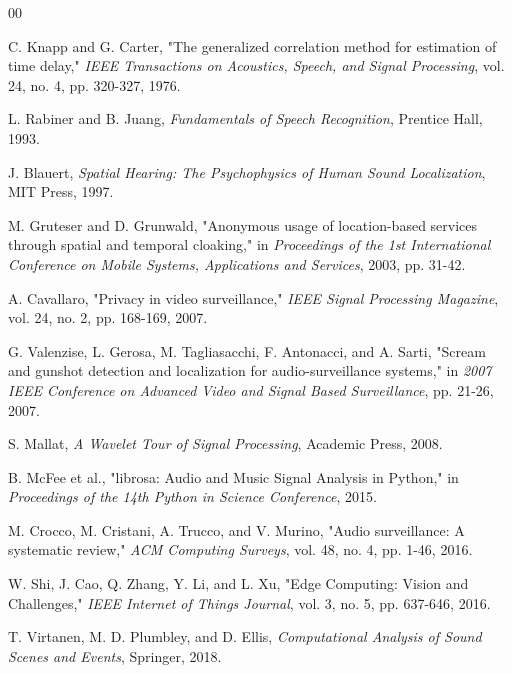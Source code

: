 \documentclass[conference]{IEEEtran}
\begin{document}
\begin{thebibliography}{00}

 C. Knapp and G. Carter, "The generalized correlation method for estimation of time delay," \textit{IEEE Transactions on Acoustics, Speech, and Signal Processing}, vol. 24, no. 4, pp. 320-327, 1976.


 L. Rabiner and B. Juang, \textit{Fundamentals of Speech Recognition}, Prentice Hall, 1993.

 J. Blauert, \textit{Spatial Hearing: The Psychophysics of Human Sound Localization}, MIT Press, 1997.

 M. Gruteser and D. Grunwald, "Anonymous usage of location-based services through spatial and temporal cloaking," in \textit{Proceedings of the 1st International Conference on Mobile Systems, Applications and Services}, 2003, pp. 31-42.

 A. Cavallaro, "Privacy in video surveillance," \textit{IEEE Signal Processing Magazine}, vol. 24, no. 2, pp. 168-169, 2007.

 G. Valenzise, L. Gerosa, M. Tagliasacchi, F. Antonacci, and A. Sarti, "Scream and gunshot detection and localization for audio-surveillance systems," in \textit{2007 IEEE Conference on Advanced Video and Signal Based Surveillance}, pp. 21-26, 2007.

 S. Mallat, \textit{A Wavelet Tour of Signal Processing}, Academic Press, 2008.

 B. McFee et al., "librosa: Audio and Music Signal Analysis in Python," in \textit{Proceedings of the 14th Python in Science Conference}, 2015.

 M. Crocco, M. Cristani, A. Trucco, and V. Murino, "Audio surveillance: A systematic review," \textit{ACM Computing Surveys}, vol. 48, no. 4, pp. 1-46, 2016.

 W. Shi, J. Cao, Q. Zhang, Y. Li, and L. Xu, "Edge Computing: Vision and Challenges," \textit{IEEE Internet of Things Journal}, vol. 3, no. 5, pp. 637-646, 2016.


 T. Virtanen, M. D. Plumbley, and D. Ellis, \textit{Computational Analysis of Sound Scenes and Events}, Springer, 2018.


\end{thebibliography}
\end{document}
